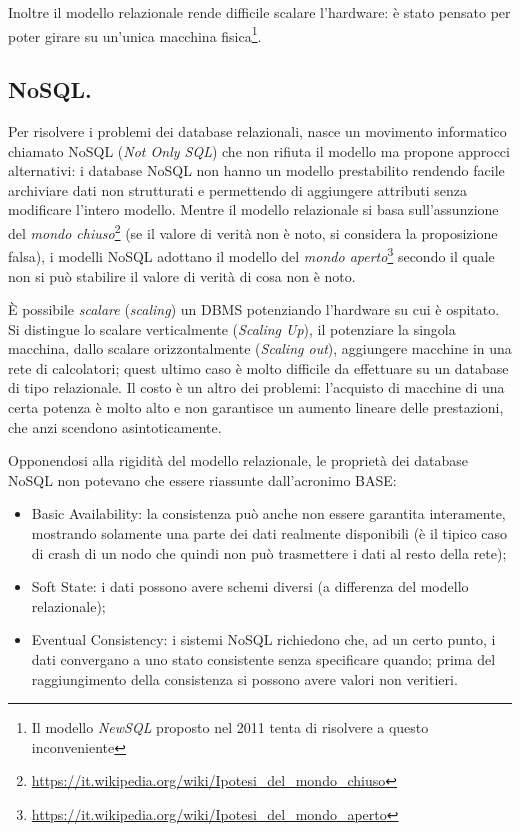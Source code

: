 \documentclass[a4page, 11pt]{article}
\begin{document}
Inoltre il modello relazionale rende difficile scalare l'hardware: è stato pensato per poter girare su un'unica macchina fisica\footnote{Il modello \textit{NewSQL} proposto nel 2011 tenta di risolvere a questo inconveniente}.


\subsection{NoSQL.}
Per risolvere i problemi dei database relazionali, nasce un movimento informatico chiamato NoSQL (\textit{Not Only SQL}) che non rifiuta il modello ma propone approcci alternativi: i database NoSQL non hanno un modello prestabilito rendendo facile archiviare dati non strutturati e permettendo di aggiungere attributi senza modificare l'intero modello.
Mentre il modello relazionale si basa sull'assunzione del \textit{mondo chiuso}\footnote{\url{https://it.wikipedia.org/wiki/Ipotesi_del_mondo_chiuso}} (se il valore di verità non è noto, si considera la proposizione falsa), i modelli NoSQL adottano il modello del \textit{mondo aperto}\footnote{\url{https://it.wikipedia.org/wiki/Ipotesi_del_mondo_aperto}} secondo il quale non si può stabilire il valore di verità di cosa non è noto.

È possibile \textit{scalare} (\textit{scaling}) un DBMS potenziando l'hardware su cui è ospitato. Si distingue lo scalare verticalmente (\textit{Scaling Up}), il potenziare la singola macchina, dallo scalare orizzontalmente (\textit{Scaling out}), aggiungere macchine in una rete di calcolatori; quest ultimo caso è molto difficile da effettuare su un database di tipo relazionale. Il costo è un altro dei problemi: l'acquisto di macchine di una certa potenza è molto alto e non garantisce un aumento lineare delle prestazioni, che anzi scendono asintoticamente.

Opponendosi alla rigidità del modello relazionale, le proprietà dei database NoSQL non potevano che essere riassunte dall'acronimo BASE:
\begin{itemize}
\item Basic Availability: la consistenza può anche non essere garantita interamente, mostrando solamente una parte dei dati realmente disponibili (è il tipico caso di crash di un nodo che quindi non può trasmettere i dati al resto della rete);
\item Soft State: i dati possono avere schemi diversi (a differenza del modello relazionale);
\item Eventual Consistency: i sistemi NoSQL richiedono che, ad un certo punto, i dati convergano a uno stato consistente senza specificare quando; prima del raggiungimento della consistenza si possono avere valori non veritieri.
\end{itemize}
\end{document}
